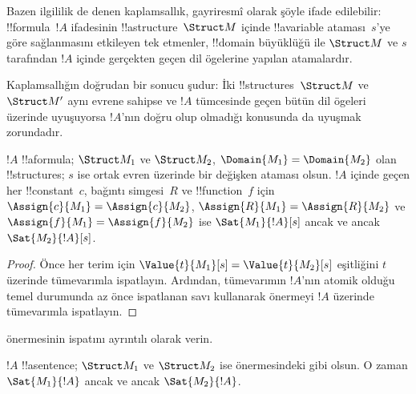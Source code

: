 



\begin{explain}
Bazen ilgililik de denen kaplamsallık, gayriresmî olarak şöyle ifade
edilebilir: !!{formula}~$!A$ ifadesinin !!a{structure}~$\Struct M$
içinde !!a{variable} ataması~$s$'ye göre sağlanmasını etkileyen
tek etmenler, !!{domain} büyüklüğü ile $\Struct M$ ve $s$ tarafından
$!A$ içinde gerçekten geçen dil ögelerine yapılan atamalardır.

Kaplamsallığın doğrudan bir sonucu şudur: İki !!{structure}s~$\Struct
M$ ve $\Struct M'$ aynı evrene sahipse ve $!A$ tümcesinde geçen bütün
dil ögeleri üzerinde uyuşuyorsa $!A$'nın doğru olup olmadığı konusunda
da uyuşmak zorundadır.
\end{explain}

\begin{prop}[Kaplamsallık]
  $!A$ !!a{formula}; $\Struct M_1$ ve $\Struct M_2$,
  $\Domain{M_1}=\Domain{M_2}$ olan !!{structure}s; $s$ ise ortak
  evren üzerinde bir değişken ataması olsun. $!A$ içinde geçen her
  !!{constant}~$c$, bağıntı simgesi~$R$ ve !!{function}~$f$ için
  $\Assign{c}{M_1}=\Assign{c}{M_2}$,
  $\Assign{R}{M_1}=\Assign{R}{M_2}$ ve
  $\Assign{f}{M_1}=\Assign{f}{M_2}$ ise
  $\Sat{M_1}{!A}[s]$ ancak ve ancak $\Sat{M_2}{!A}[s]$.
\end{prop}

\begin{proof}
  Önce her terim için $\Value{t}{M_1}[s]=\Value{t}{M_2}[s]$
  eşitliğini $t$ üzerinde tümevarımla ispatlayın. Ardından, tümevarımın
  $!A$'nın atomik olduğu temel durumunda az önce ispatlanan savı
  kullanarak önermeyi $!A$ üzerinde tümevarımla ispatlayın.
\end{proof}

\begin{prob}
 önermesinin ispatını
ayrıntılı olarak verin.
\end{prob}

\begin{cor}
  $!A$ !!a{sentence}; $\Struct M_1$ ve $\Struct M_2$ ise
   önermesindeki gibi olsun. O zaman
  $\Sat{M_1}{!A}$ ancak ve ancak $\Sat{M_2}{!A}$.
\end{cor}

